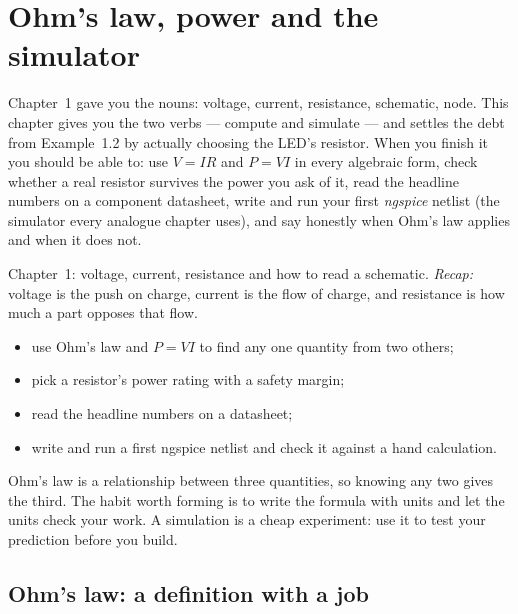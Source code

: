\chapter{Ohm's law, power and the simulator}
\label{ch:ohm}

Chapter~1 gave you the nouns: voltage, current, resistance, schematic, node.
This chapter gives you the two verbs — compute and simulate — and settles the
debt from Example~1.2 by actually choosing the LED's resistor. When you finish
it you should be able to: use $V=IR$ and $P=VI$ in every algebraic form,
check whether a real resistor survives the power you ask of it, read the
headline numbers on a component datasheet, write and run your first
\emph{ngspice} netlist (the simulator every analogue chapter uses), and say
honestly when Ohm's law applies and when it does not.

\begin{rulebox}
Chapter~1: voltage, current, resistance and how to read a schematic. \emph{Recap:} voltage is the push on charge, current is the flow of charge, and resistance is how much a part opposes that flow.
\end{rulebox}
\begin{wins}
\begin{itemize}
\item use Ohm's law and $P=VI$ to find any one quantity from two others;
\item pick a resistor's power rating with a safety margin;
\item read the headline numbers on a datasheet;
\item write and run a first ngspice netlist and check it against a hand calculation.
\end{itemize}
\end{wins}
\begin{principle}
Ohm's law is a relationship between three quantities, so knowing any two gives the third. The habit worth forming is to write the formula with units and let the units check your work. A simulation is a cheap experiment: use it to test your prediction before you build.
\end{principle}

\section{Ohm's law: a definition with a job}
\label{sec:ohmslaw}

